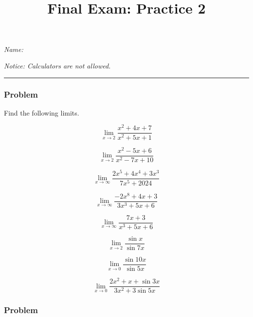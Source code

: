 \documentclass[
  letterpaper,
  DIV=11,
  numbers=noendperiod]{scrartcl}
\title{Final Exam: Practice 2}
\author{}
\date{}
\begin{document}
\maketitle

\thispagestyle{empty}

\emph{Name:}

\emph{Notice: Calculators are not allowed. }

\begin{center}\rule{0.5\linewidth}{0.5pt}\end{center}

\subsubsection{Problem}\label{problem}

Find the following limits.

\[\lim_{x \to 2} \frac{x^2 + 4x + 7}{x^2 +5x + 1}\]

\hfill\break
\hfill\break
\hfill\break
\hfill\break

\thispagestyle{empty}

\[\lim_{x \to 2} \frac{x^2 - 5x + 6}{x^2 -7x + 10}\]

\hfill\break
\hfill\break
\hfill\break
\hfill\break
\hfill\break

\[\lim_{x \to \infty} \frac{2x^5 +4x^4 + 3x^3}{7x^5 + 2024}\]

\hfill\break
\hfill\break
\hfill\break
\hfill\break
\hfill\break

\[\lim_{x \to \infty} \frac{-2x^8 +4x + 3}{3x^3 +5x + 6}\]

\hfill\break
\hfill\break
\hfill\break
\hfill\break
\hfill\break

\[\lim_{x \to \infty} \frac{7x + 3}{x^3 +5x + 6}\]

\hfill\break
\hfill\break
\hfill\break
\hfill\break
\hfill\break
\thispagestyle{empty}

\[\lim_{x \to 2} \frac{\sin x }{\sin 7x}\]

\hfill\break
\hfill\break
\hfill\break
\hfill\break
\hfill\break

\[\lim_{x \to 0} \frac{\sin 10x }{\sin 5x}\]

\hfill\break
\hfill\break
\hfill\break
\hfill\break
\hfill\break

\[\lim_{x \to 0} \frac{2x^2 + x+ \sin 3x }{3x^2 + 3\sin 5x}\]

\hfill\break
\hfill\break
\hfill\break
\hfill\break
\hfill\break

\subsubsection{Problem}\label{problem-1}
\end{document}
